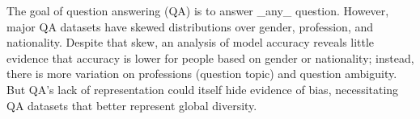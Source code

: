 The goal of question answering (QA) is to answer \_any\_ question. However, major QA datasets have skewed distributions over gender, profession, and nationality. Despite that skew, an analysis of model accuracy reveals little evidence that accuracy is lower for people based on gender or nationality; instead, there is more variation on professions (question topic) and question ambiguity. But QA's lack of representation could itself hide evidence of bias, necessitating QA datasets that better represent global diversity.
